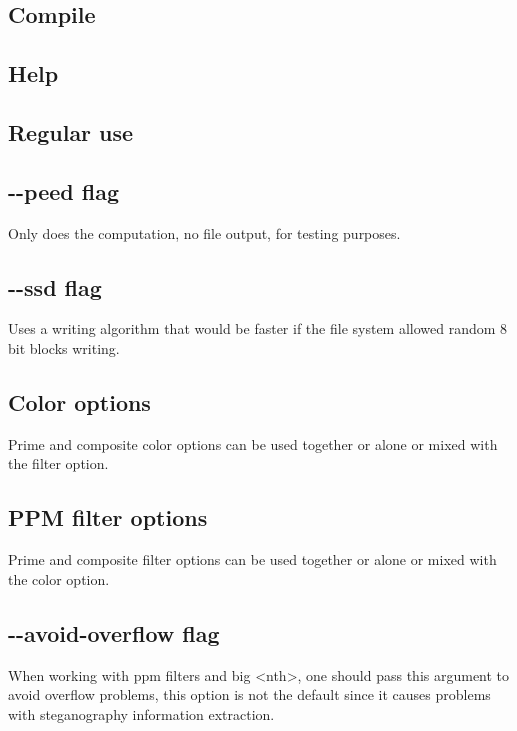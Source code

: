 \subsection{Compile}



\subsection{Help}



\subsection{Regular use}


\subsection{-{}-peed flag}
Only does the computation, no file output, for testing purposes.



\subsection{-{}-ssd flag}
Uses a writing algorithm that would be faster if the file system allowed random 8 bit blocks writing.



\subsection{Color options}
Prime and composite color options can be used together or alone or mixed with the filter option.


\subsection{PPM filter options}
Prime and composite filter options can be used together or alone or mixed with the color option.


\subsection{-{}-avoid-overflow flag}
When working with ppm filters and big <nth>, one should pass this argument to avoid overflow problems, this option is not the default since it causes problems with steganography information extraction.


